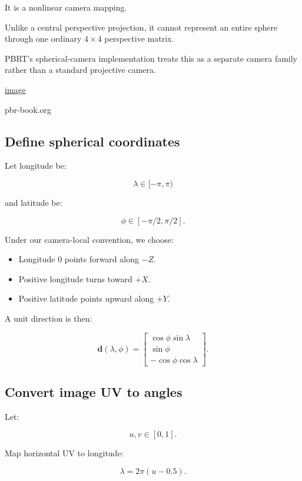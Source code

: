 It is a nonlinear camera mapping.

Unlike a central perspective projection, it cannot represent an entire sphere through one ordinary \(4\times4\) perspective matrix.

PBRT's spherical-camera implementation treats this as a separate camera family rather than a standard projective camera. 

\href{https://www.google.com/s2/favicons?domain=https://pbr-book.org&sz=32}{image}

pbr-book.org

\subsection{Define spherical coordinates}\label{02-foundations-ii-ch035-define-spherical-coordinates}

Let longitude be:

\[ \lambda\in[-\pi,\pi) \]

and latitude be:

\[ \phi\in[-\pi/2,\pi/2]. \]

Under our camera-local convention, we choose:

\begin{itemize}
\tightlist
\item
  Longitude \(0\) points forward along \(-Z\).
\item
  Positive longitude turns toward \(+X\).
\item
  Positive latitude points upward along \(+Y\).
\end{itemize}

A unit direction is then:

\[ \boxed{ \mathbf d(\lambda,\phi)= \begin{bmatrix} \cos\phi\sin\lambda\\ \sin\phi\\ -\cos\phi\cos\lambda \end{bmatrix}. } \]

\subsection{Convert image UV to angles}\label{02-foundations-ii-ch035-convert-image-uv-to-angles}

Let:

\[ u,v\in[0,1]. \]

Map horizontal UV to longitude:

\[ \boxed{ \lambda=2\pi(u-0.5). } \]


